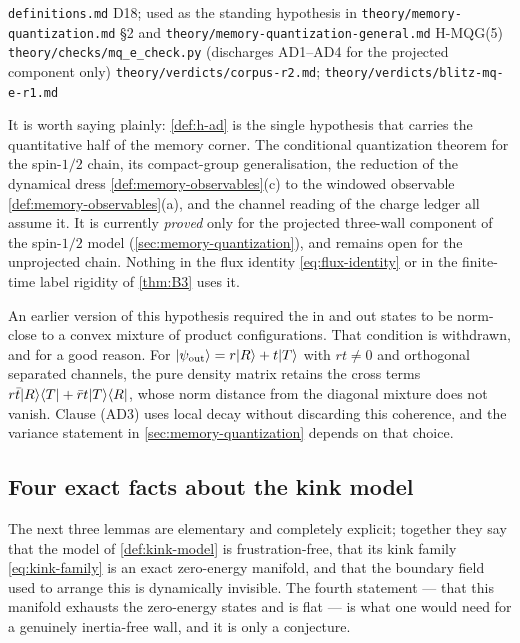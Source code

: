 %
{\texttt{definitions.md} D18; used as the standing hypothesis in
 \texttt{theory/memory-quantization.md} \S2 and
 \texttt{theory/memory-quantization-general.md} H-MQG(5)}%
{\texttt{theory/checks/mq\_e\_check.py} (discharges AD1--AD4 for the projected
 component only)}%
{\texttt{theory/verdicts/corpus-r2.md};
 \texttt{theory/verdicts/blitz-mq-e-r1.md}}

\begin{remark}
\label{rem:h-ad-load-bearing}
It is worth saying plainly: \cref{def:h-ad} is the single hypothesis that
carries the quantitative half of the memory corner. The conditional
quantization theorem for the spin-$1/2$ chain, its compact-group
generalisation, the reduction of the dynamical dress
\cref{def:memory-observables}(c) to the windowed observable
\cref{def:memory-observables}(a), and the channel reading of the charge ledger
all assume it. It is currently \emph{proved} only for the projected
three-wall component of the spin-$1/2$ model (\cref{sec:memory-quantization}),
and remains open for the unprojected chain. Nothing in the flux identity
\eqref{eq:flux-identity} or in the finite-time label rigidity of
\cref{thm:B3} uses it.
\end{remark}

\begin{remark}
\label{rem:h-ad-r1}
An earlier version of this hypothesis required the in and out states to be
norm-close to a convex mixture of product configurations. That condition is
withdrawn, and for a good reason. For
$|\psi_{\mathrm{out}}\rangle=r|R\rangle+t|T\rangle$ with $rt\neq0$ and orthogonal
separated channels, the pure density matrix retains the cross terms
$r\bar t|R\rangle\langle T|+\bar r t|T\rangle\langle R|$, whose norm distance from the
diagonal mixture does not vanish. Clause (AD3) uses local decay without
discarding this coherence, and the variance statement in
\cref{sec:memory-quantization} depends on that choice.
\end{remark}

\subsection{Four exact facts about the kink model}

The next three lemmas are elementary and completely explicit; together they say
that the model of \cref{def:kink-model} is frustration-free, that its kink
family \eqref{eq:kink-family} is an exact zero-energy manifold, and that the
boundary field used to arrange this is dynamically invisible. The fourth
statement --- that this manifold exhausts the zero-energy states and is flat ---
is what one would need for a genuinely inertia-free wall, and it is only a
conjecture.

